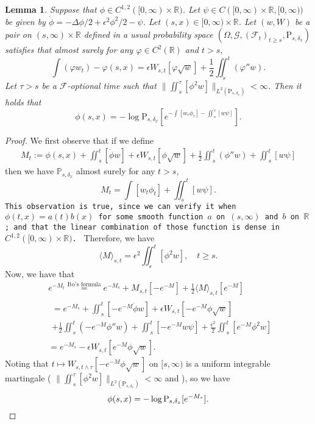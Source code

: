 \documentclass[12pt,a4paper]{amsart}
\numberwithin{equation}{section}
\theoremstyle{plain}
\newtheorem{lemma}[theorem]{Lemma}
\theoremstyle{remark}
\begin{document}
\begin{lemma} \label{thm:W.044}
	Suppose that $\phi \in C^{1,2}([0,\infty)\times \mathbb R)$. 
	Let $\psi \in C([0,\infty) \times \mathbb R, [0,\infty))$ be given by $\dot \phi= - \Delta\phi /2 + \epsilon^2\phi^2/2 - \psi$.
	Let $(s,x) \in [0,\infty) \times \mathbb R$.
	Let $(w, W)$ be a pair on $(s, \infty) \times \mathbb R$ defined in a usual probability space $(\Omega, \mathcal G, (\mathcal F_t)_{t\geq s}, \mathrm P_{s,\delta_x})$ satisfies that almost surely for any $\varphi \in C^2(\mathbb R)$ and $t > s$, 
\begin{equation}
	\int (\varphi w_t ) - \varphi(s,x) 
	= \epsilon W_{s,t} [\varphi \sqrt{w}]  + \frac{1}{2}\iint_s^t (\varphi'' w).
\end{equation}
	Let $\tau > s$ be a $\mathcal F$-optional time such that $\|\iint_s^\tau [\phi^2 w]\|_{L^2(\mathrm P_{s,\delta_x})} < \infty$.
	Then it holds that
\[
	\phi(s,x) = - \log \mathrm P_{s, \delta_x} \left[e^{- \int [w_\tau\phi_\tau] - \iint_s^\tau [w \psi]  }\right].
\]
\end{lemma}
\begin{proof}

	We first observe that if we define
\begin{align}
	M_t:=\phi(s,x) +\iint_s^t [\dot \phi w] + \epsilon W_{s,t}[\phi \sqrt{w}] + \frac{1}{2} \iint_s^t (\phi'' w) + \iint_s^t [w \psi]
\end{align}
	then we have $\mathbb P_{s,\delta_x}$ almost surely for any $t>s$,
\begin{equation}
	M_t= \int [w_{t} \phi_{t}] + \iint_s^t [w \psi].
\end{equation}
	{\tt This observation is true, since we can verify it when $\phi(t,x) = a(t) b(x)$ for some smooth function $a$ on $(s,\infty)$ and $b$ on $\mathbb R$; and that the linear combination of those function is dense in $C^{1,2}([0,\infty) \times \mathbb R)$. }
	Therefore, we have
\[
	\langle M\rangle_{s,t} = \epsilon^2 \iint_s^t [\phi^2 w], \quad t\geq s.
\]
	Now, we have that
\begin{align}
	& e^{- M_t}
	\overset{\text{Ito's formula}}= e^{- M_s}+  M_{s,t}[-e^{-M}] + \frac{1}{2} \langle M \rangle_{s,t}[e^{-M}]
	\\& \begin{multlined}
	=  e^{- M_s}+  \iint_s^t [-e^{-M}\dot \phi w] + \epsilon W_{s,t}[-e^{-M}\phi \sqrt{w}] 
	\\+ \frac{1}{2} \iint_s^t (-e^{-M}\phi'' w) + \iint_s^t [-e^{-M}w\psi]+ \frac{\epsilon^2}{2} \iint_s^t [e^{-M}\phi^2 w]
	\end{multlined}
	\\& = e^{- M_s} - \epsilon W_{s,t}[e^{-M}\phi \sqrt{w}].
\end{align}
	Noting that $t \mapsto W_{s,t\wedge \tau}[-e^{-M}\phi \sqrt w ]$ on $[s, \infty)$ is a uniform integrable martingale ( $\|\iint_s^\tau [\phi^2 w]\|_{L^2(\mathrm P_{s,\delta_x})} < \infty$ and \cite[Corollary 17.8]{Kallenberg2002Foundations}), so we have 
\begin{equation}
	\phi(s,x) 
	= -\log\mathrm P_{s, \delta_x} [e^{- M_{\tau}}].
\qedhere
\end{equation}
\end{proof}
\end{document}
